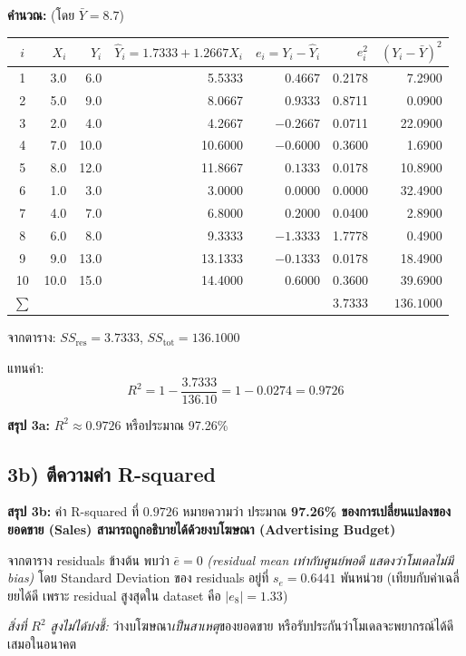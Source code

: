 \documentclass[12pt,a4paper]{article}
\begin{document}
\textbf{คำนวณ:} (โดย $\bar{Y} = 8.7$)

\begin{table}[H]
\centering
\small
\begin{tabular}{c r r r r r r}
\toprule
$i$ & $X_i$ & $Y_i$ & $\hat{Y}_i = 1.7333 + 1.2667X_i$ & $e_i = Y_i - \hat{Y}_i$ & $e_i^2$ & $(Y_i - \bar{Y})^2$ \\
\midrule
1  & 3.0  & 6.0  & 5.5333  & $0.4667$  & 0.2178  & 7.2900   \\
2  & 5.0  & 9.0  & 8.0667  & $0.9333$  & 0.8711  & 0.0900   \\
3  & 2.0  & 4.0  & 4.2667  & $-0.2667$ & 0.0711  & 22.0900  \\
4  & 7.0  & 10.0 & 10.6000 & $-0.6000$ & 0.3600  & 1.6900   \\
5  & 8.0  & 12.0 & 11.8667 & $0.1333$  & 0.0178  & 10.8900 \\
6  & 1.0  & 3.0  & 3.0000  & $0.0000$  & 0.0000  & 32.4900  \\
7  & 4.0  & 7.0  & 6.8000  & $0.2000$  & 0.0400  & 2.8900   \\
8  & 6.0  & 8.0  & 9.3333  & $-1.3333$ & 1.7778  & 0.4900   \\
9  & 9.0  & 13.0 & 13.1333 & $-0.1333$ & 0.0178  & 18.4900 \\
10 & 10.0 & 15.0 & 14.4000 & $0.6000$  & 0.3600  & 39.6900 \\
\midrule
$\sum$ & & & & & $\mathbf{3.7333}$ & $\mathbf{136.1000}$ \\
\bottomrule
\end{tabular}
\end{table}

จากตาราง: $SS_{\text{res}} = 3.7333$, $SS_{\text{tot}} = 136.1000$

แทนค่า:
\[
    R^2 = 1 - \frac{3.7333}{136.10} = 1 - 0.0274 = 0.9726
\]

\begin{ansbox}
\textbf{สรุป 3a:} \quad $\boxed{R^2 \approx 0.9726}$ หรือประมาณ 97.26\%
\end{ansbox}

\subsection*{3b) ตีความค่า R-squared}

\begin{ansbox}
\textbf{สรุป 3b:} \quad ค่า R-squared ที่ $0.9726$ หมายความว่า ประมาณ \textbf{97.26\% ของการเปลี่ยนแปลงของยอดขาย (Sales) สามารถถูกอธิบายได้ด้วยงบโฆษณา (Advertising Budget)}

จากตาราง residuals ข้างต้น พบว่า $\bar{e} = 0$ \textit{(residual mean เท่ากับศูนย์พอดี แสดงว่าโมเดลไม่มี bias)} โดย Standard Deviation ของ residuals อยู่ที่ $s_e = 0.6441$ พันหน่วย (เทียบกับค่าเฉลี่ยยได้ดี เพราะ residual สูงสุดใน dataset คือ $|e_8| = 1.33$)

\textit{สิ่งที่ $R^2$ สูงไม่ได้บ่งชี้:} ว่างบโฆษณา\emph{เป็นสาเหตุ}ของยอดขาย หรือรับประกันว่าโมเดลจะพยากรณ์ได้ดีเสมอในอนาคต
\end{ansbox}
\end{document}
